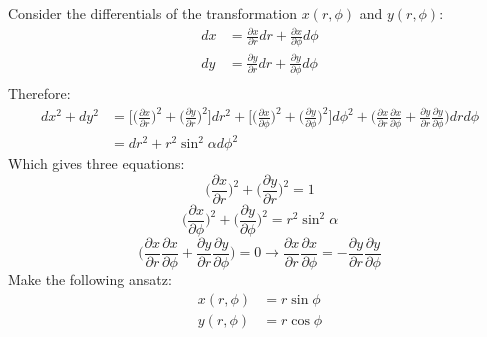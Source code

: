 \documentclass[9pt]{report}
\begin{document}
\begin{enumerate}
\begin{enumerate}
        Consider the differentials of the transformation $x(r, \phi)$ and
        $y(r, \phi)$:
        \[
          \begin{align}
            dx &= \frac{\partial x}{\partial r} dr + \frac{\partial x}{\partial \phi} d\phi \\
            dy &= \frac{\partial y}{\partial r} dr + \frac{\partial y}{\partial \phi} d\phi \\
          \end{align}
        \]
        Therefore:
        \[
          \begin{align}
           dx^2 + dy^2 &= \Big[ \Big(\frac{\partial x}{\partial r}\Big)^2 + \Big(\frac{\partial y}{\partial r}\Big)^2 \Big]dr^2 +
                          \Big[ \Big(\frac{\partial x}{\partial \phi}\Big)^2 + \Big(\frac{\partial y}{\partial \phi}\Big)^2\Big] d\phi^2 +
                          \Big(\frac{\partial x}{\partial r}\frac{\partial x}{\partial \phi} + \frac{\partial y}{\partial r}\frac{\partial y}{\partial \phi}\Big) dr d\phi \\
                       &= dr^2 + r^2\sin^2\alpha d\phi^2
          \end{align}
        \]
        Which gives three equations:
        \begin{equation}
          \label{eqn:first}
          \Big(\frac{\partial x}{\partial r}\Big)^2 + \Big(\frac{\partial y}{\partial r}\Big)^2 = 1
        \end{equation}
        \begin{equation}
          \label{eqn:second}
          \Big(\frac{\partial x}{\partial \phi}\Big)^2 + \Big(\frac{\partial y}{\partial \phi}\Big)^2 = r^2 \sin^2\alpha
        \end{equation}
        \begin{equation}
          \label{eqn:third}
          \Big(\frac{\partial x}{\partial r}\frac{\partial x}{\partial \phi} + \frac{\partial y}{\partial r}\frac{\partial y}{\partial \phi}\Big) = 0 \to \frac{\partial x}{\partial r}\frac{\partial x}{\partial \phi} = -\frac{\partial y}{\partial r}\frac{\partial y}{\partial \phi}
        \end{equation}
        Make the following ansatz:
        \[
          \begin{align}
            x(r, \phi) &= r\sin\phi \\
            y(r, \phi) &= r\cos\phi
          \end{align}
        \]
        \[
          \begin{align}

\end{align}\]
\end{enumerate}
\end{enumerate}
\end{document}
